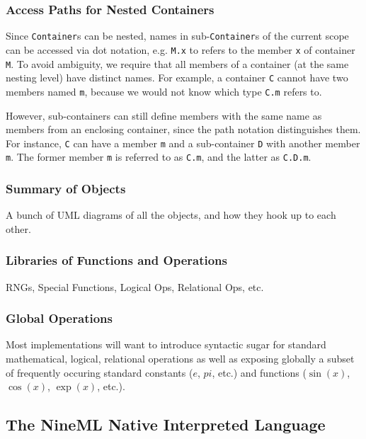 \documentclass[a4paper]{article}
\newcommand\nmlClass[1]{{\tt #1}}
\begin{document}
\subsubsection{Access Paths for Nested Containers}

Since \nmlClass{Container}s can be nested, names in
sub-\nmlClass{Container}s of the current scope can be accessed via dot
notation, e.g. \verb^M.x^ to refers to the member \verb^x^ of
container \verb^M^.  To avoid ambiguity, we require that all members of
a container (at the same nesting level) have distinct names. For
example, a container \verb^C^ cannot have two members named \verb^m^, because we
would not know which type \verb^C.m^ refers to.

However, sub-containers can still define members with the same name as
members from an enclosing container, since the path notation
distinguishes them. For instance, \verb^C^ can have a member \verb^m^ and a
sub-container \verb^D^ with another member \verb^m^.  The former member \verb^m^ is
referred to as \verb^C.m^, and the latter as \verb^C.D.m^. 

\subsubsection{Summary of Objects}

A bunch of UML diagrams of all the objects, and how they hook up to each other.

\subsubsection{\label{nml_lib}Libraries of Functions and Operations}

RNGs, Special Functions, Logical Ops, Relational Ops, etc.

\subsubsection{Global Operations}

Most implementations will want to introduce syntactic sugar for
standard mathematical, logical, relational operations as well as
exposing globally a subset of frequently occuring standard constants
($e$, $pi$, etc.) and functions ($\sin(x)$, $\cos(x)$, $\exp(x)$,
etc.).


\subsection{The NineML Native Interpreted Language}
\end{document}
